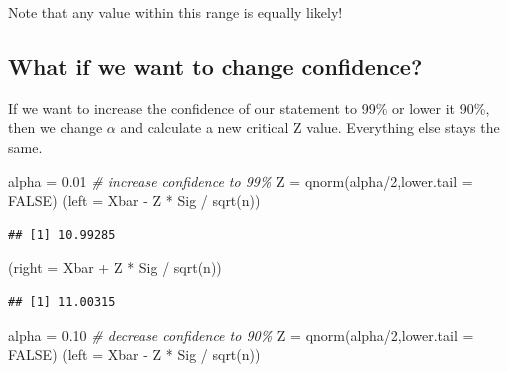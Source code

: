 \documentclass[
]{book}
\newenvironment{Shaded}{\begin{snugshade}}{\end{snugshade}}
\newcommand{\AttributeTok}[1]{\textcolor[rgb]{0.77,0.63,0.00}{#1}}
\newcommand{\CommentTok}[1]{\textcolor[rgb]{0.56,0.35,0.01}{\textit{#1}}}
\newcommand{\ConstantTok}[1]{\textcolor[rgb]{0.00,0.00,0.00}{#1}}
\newcommand{\DecValTok}[1]{\textcolor[rgb]{0.00,0.00,0.81}{#1}}
\newcommand{\FloatTok}[1]{\textcolor[rgb]{0.00,0.00,0.81}{#1}}
\newcommand{\FunctionTok}[1]{\textcolor[rgb]{0.00,0.00,0.00}{#1}}
\newcommand{\NormalTok}[1]{#1}
\newcommand{\OtherTok}[1]{\textcolor[rgb]{0.56,0.35,0.01}{#1}}
\newcommand{\SpecialCharTok}[1]{\textcolor[rgb]{0.00,0.00,0.00}{#1}}
\begin{document}
Note that any value within this range is equally likely!

\hypertarget{what-if-we-want-to-change-confidence}{%
\subsection{What if we want to change confidence?}\label{what-if-we-want-to-change-confidence}}

If we want to increase the confidence of our statement to 99\% or lower it 90\%, then we change \(\alpha\) and calculate a new critical Z value. Everything else stays the same.

\begin{Shaded}
\begin{Highlighting}[]
\NormalTok{alpha }\OtherTok{=} \FloatTok{0.01} \CommentTok{\# increase confidence to 99\%}
\NormalTok{Z }\OtherTok{=} \FunctionTok{qnorm}\NormalTok{(alpha}\SpecialCharTok{/}\DecValTok{2}\NormalTok{,}\AttributeTok{lower.tail =} \ConstantTok{FALSE}\NormalTok{)}
\NormalTok{(}\AttributeTok{left =}\NormalTok{ Xbar }\SpecialCharTok{{-}}\NormalTok{ Z }\SpecialCharTok{*}\NormalTok{ Sig }\SpecialCharTok{/} \FunctionTok{sqrt}\NormalTok{(n))}
\end{Highlighting}
\end{Shaded}

\begin{verbatim}
## [1] 10.99285
\end{verbatim}

\begin{Shaded}
\begin{Highlighting}[]
\NormalTok{(}\AttributeTok{right =}\NormalTok{ Xbar }\SpecialCharTok{+}\NormalTok{ Z }\SpecialCharTok{*}\NormalTok{ Sig }\SpecialCharTok{/} \FunctionTok{sqrt}\NormalTok{(n))}
\end{Highlighting}
\end{Shaded}

\begin{verbatim}
## [1] 11.00315
\end{verbatim}

\begin{Shaded}
\begin{Highlighting}[]
\NormalTok{alpha }\OtherTok{=} \FloatTok{0.10} \CommentTok{\# decrease confidence to 90\%}
\NormalTok{Z }\OtherTok{=} \FunctionTok{qnorm}\NormalTok{(alpha}\SpecialCharTok{/}\DecValTok{2}\NormalTok{,}\AttributeTok{lower.tail =} \ConstantTok{FALSE}\NormalTok{)}
\NormalTok{(}\AttributeTok{left =}\NormalTok{ Xbar }\SpecialCharTok{{-}}\NormalTok{ Z }\SpecialCharTok{*}\NormalTok{ Sig }\SpecialCharTok{/} \FunctionTok{sqrt}\NormalTok{(n))}
\end{Highlighting}
\end{Shaded}
\end{document}
